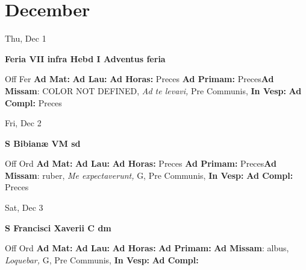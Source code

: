 \documentclass[10pt]{book}
\begin{document}
    \chapter*{December}
                    
\begin{center}
\begin{minipage}{3.5in}
\vspace{2em}
\begin{center}Thu, Dec 1
\end{center}
\textbf{ \large Feria VII infra Hebd I Adventus
\textnormal{\normalsize feria}}

\begin{justify}Off Fer
\textbf{Ad Mat: }
\textbf{Ad Lau: }
\textbf{Ad Horas: }Preces
\textbf{Ad Primam: }Preces\textbf{Ad Missam}: COLOR NOT DEFINED, \textit{Ad te levavi,} Pre Communis, 
\textbf{In Vesp: }
\textbf{Ad Compl: }Preces
\end{justify}
\end{minipage}
\end{center}

\begin{center}
\begin{minipage}{3.5in}
\vspace{2em}
\begin{center}Fri, Dec 2
\end{center}
\textbf{ \large S Bibianæ VM
\textnormal{\normalsize sd}}

\begin{justify}Off Ord
\textbf{Ad Mat: }
\textbf{Ad Lau: }
\textbf{Ad Horas: }Preces
\textbf{Ad Primam: }Preces\textbf{Ad Missam}: ruber, \textit{Me expectaverunt,} G, Pre Communis, 
\textbf{In Vesp: }
\textbf{Ad Compl: }Preces
\end{justify}
\end{minipage}
\end{center}

\begin{center}
\begin{minipage}{3.5in}
\vspace{2em}
\begin{center}Sat, Dec 3
\end{center}
\textbf{ \large S Francisci Xaverii C
\textnormal{\normalsize dm}}

\begin{justify}Off Ord
\textbf{Ad Mat: }
\textbf{Ad Lau: }
\textbf{Ad Horas: }
\textbf{Ad Primam: }\textbf{Ad Missam}: albus, \textit{Loquebar,} G, Pre Communis, 
\textbf{In Vesp: }
\textbf{Ad Compl: }
\end{justify}
\end{minipage}
\end{center}
\end{document}
